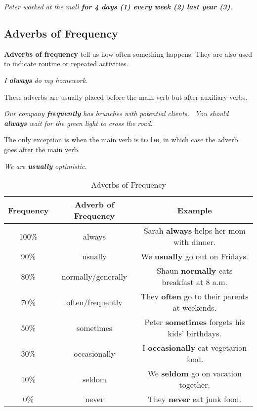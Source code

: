 \documentclass[hidelinks,10pt,a4paper]{article}
\begin{document}
\begin{center}
	\textit{Peter worked at the mall \textbf{for 4 days (1) every week (2) last year (3)}. }
\end{center}

\subsection{Adverbs of Frequency}
\textbf{Adverbs of frequency} tell us how often something happens. They are also used to indicate routine or repeated activities.

\begin{center}
	\textit{I \textbf{always} do my homework.}
\end{center}

These adverbs are usually placed before the main verb but after auxiliary verbs.

\begin{center}
	\textit{Our company \textbf{frequently} has brunches with potential clients. \
	You should \textbf{always} wait for the green light to cross the road.}
\end{center}

The only exception is when the main verb is \textbf{to be}, in which case the adverb goes after the main verb.

\begin{center}
	\textit{We are \textbf{usually} optimistic.}
\end{center}

\begin{table}[h]
\begin{center}
\begin{tabular}{|c|c|c|}
	\hline
	\textbf{Frequency} & \textbf{Adverb of Frequency} & \textbf{Example} \\ \hline
	100\% & always & Sarah \textbf{always} helps her mom with dinner. \\ \hline
	90\% & usually & We \textbf{usually} go out on Fridays. \\ \hline
	80\% & normally/generally & Shaun \textbf{normally} eats breakfast at 8 a.m. \\ \hline
	70\% & often/frequently & They \textbf{often} go to their parents at weekends. \\ \hline
	50\% & sometimes & Peter \textbf{sometimes} forgets his kids' birthdays. \\ \hline
	30\% & occasionally & I \textbf{occasionally} eat vegetarion food. \\ \hline
	10\% & seldom & We \textbf{seldom} go on vacation together. \\ \hline
	0\% & never & They \textbf{never} eat junk food. \\ \hline
\end{tabular}
\end{center}
\caption{Adverbs of Frequency} \label{tab:af1}
\end{table}
\end{document}
